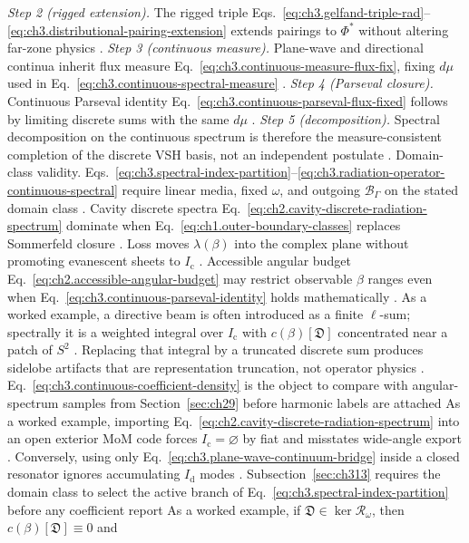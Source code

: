 \emph{Step 2 (rigged extension).} The rigged triple Eqs.~\eqref{eq:ch3.gelfand-triple-rad}--\eqref{eq:ch3.distributional-pairing-extension} extends pairings to \(\Phi^{*}\) without altering far-zone physics .
\emph{Step 3 (continuous measure).} Plane-wave and directional continua inherit flux measure Eq.~\eqref{eq:ch3.continuous-measure-flux-fix}, fixing \(d\mu\) used in Eq.~\eqref{eq:ch3.continuous-spectral-measure} .
\emph{Step 4 (Parseval closure).} Continuous Parseval identity Eq.~\eqref{eq:ch3.continuous-parseval-flux-fixed} follows by limiting discrete sums with the same \(d\mu\) .
\emph{Step 5 (decomposition).} Spectral decomposition on the continuous spectrum is therefore the measure-consistent completion of the discrete VSH basis, not an independent postulate .
Domain-class validity. Eqs.~\eqref{eq:ch3.spectral-index-partition}--\eqref{eq:ch3.radiation-operator-continuous-spectral}
require linear media, fixed \(\omega\), and outgoing \(\mathcal{B}_\Gamma\) on the stated domain class
. Cavity discrete spectra Eq.~\eqref{eq:ch2.cavity-discrete-radiation-spectrum}
dominate when Eq.~\eqref{eq:ch1.outer-boundary-classes} replaces Sommerfeld closure
. Loss moves \(\lambda(\beta)\) into the complex plane without promoting
evanescent sheets to \(I_{\mathrm{c}}\) . Accessible angular budget
Eq.~\eqref{eq:ch2.accessible-angular-budget} may restrict observable \(\beta\) ranges even when
Eq.~\eqref{eq:ch3.continuous-parseval-identity} holds mathematically .
As a worked example, a directive beam is often introduced as a finite \(\ell\)-sum; spectrally it is a weighted integral
over \(I_{\mathrm{c}}\) with \(c(\beta)[\mathfrak{D}]\) concentrated near a patch of \(S^{2}\)
. Replacing that integral by a truncated discrete sum produces
sidelobe artifacts that are representation truncation, not operator physics
. Eq.~\eqref{eq:ch3.continuous-coefficient-density} is the object to compare with
angular-spectrum samples from Section~\ref{sec:ch29} before harmonic labels are attached
As a worked example, importing Eq.~\eqref{eq:ch2.cavity-discrete-radiation-spectrum} into an open exterior MoM code
forces \(I_{\mathrm{c}}=\varnothing\) by fiat and misstates wide-angle export
. Conversely, using only
Eq.~\eqref{eq:ch3.plane-wave-continuum-bridge} inside a closed resonator ignores accumulating
\(I_{\mathrm{d}}\) modes . Subsection~\ref{sec:ch313} requires the domain class to
select the active branch of Eq.~\eqref{eq:ch3.spectral-index-partition} before any coefficient report
As a worked example, if \(\mathfrak{D}\in\ker\mathcal{R}_\omega\), then \(c(\beta)[\mathfrak{D}]\equiv 0\) and
